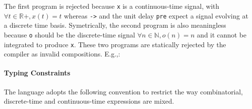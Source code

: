 \documentclass[11pt,titlepage,twoside]{report}
\newcommand{\bR}{\mathbb{R}}
\newcommand{\bN}{\mathbb{N}}
\newcommand{\Marc}[1]{{\bf Marc.} {#1} {\bf Fin}}
\newcommand{\Tim}[1]{{\bf Tim.} {#1} {\bf Fin}}
\begin{document}

The first program is rejected because \texttt{x} is a continuous-time
signal, with $\forall t \in \bR+, x(t) = t$ whereas \texttt{->} and
the unit delay \texttt{pre} expect a signal evolving at a discrete
time basis. Symetrically, the second program is also meaningless
because \verb-o- should be the discrete-time signal $\forall n \in
\bN, o(n) = n$ and it cannot be integrated to produce \verb-x-.
These two programs
are statically rejected by the compiler as invalid
compositions. E.g.,: \runverbatimerr{}

\paragraph{Typing Constraints}

\newcommand{\AnyKind}{\mathtt{A}}
\newcommand{\NodeKind}{\mathtt{D}}
\newcommand{\HybridKind}{\mathtt{C}}

The language adopts the following convention to restrict the
way combinatorial, discrete-time and continuous-time expressions are mixed.
\end{document}
